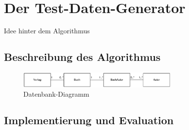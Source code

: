 \section{Der Test-Daten-Generator}
Idee hinter dem Algorithmus

	\subsection{Beschreibung des Algorithmus}

	\begin{figure}[htb]
		\begin{center}
			\includegraphics[width=8cm]{images/database.png}
			\caption{\label{database}Datenbank-Diagramm}
		\end{center}
	\end{figure}
	

	

	\subsection{Implementierung und Evaluation}

